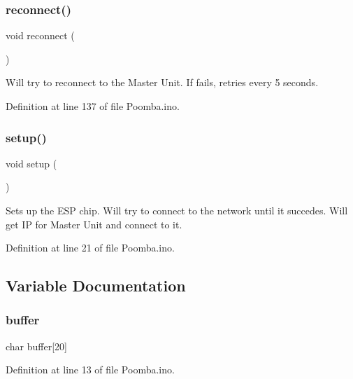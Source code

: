 \mbox{\label{_poomba_8ino_a4bcd6ce7d04c38f8c4ff908d1fc50f86}} 
\subsubsection{\texorpdfstring{reconnect()}{reconnect()}}
{\footnotesize\ttfamily void reconnect (\begin{DoxyParamCaption}{ }\end{DoxyParamCaption})}

Will try to reconnect to the Master Unit. If fails, retries every 5 seconds. 

Definition at line 137 of file Poomba.\+ino.

\mbox{\label{_poomba_8ino_a4fc01d736fe50cf5b977f755b675f11d}} 
\subsubsection{\texorpdfstring{setup()}{setup()}}
{\footnotesize\ttfamily void setup (\begin{DoxyParamCaption}{ }\end{DoxyParamCaption})}

Sets up the E\+SP chip. Will try to connect to the network until it succedes. Will get IP for Master Unit and connect to it. 

Definition at line 21 of file Poomba.\+ino.



\subsection{Variable Documentation}
\mbox{\label{_poomba_8ino_a5819dbc2d305e99e930c734a0d28bc3b}} 
\subsubsection{\texorpdfstring{buffer}{buffer}}
{\footnotesize\ttfamily char buffer\mbox{[}20\mbox{]}}



Definition at line 13 of file Poomba.\+ino.

